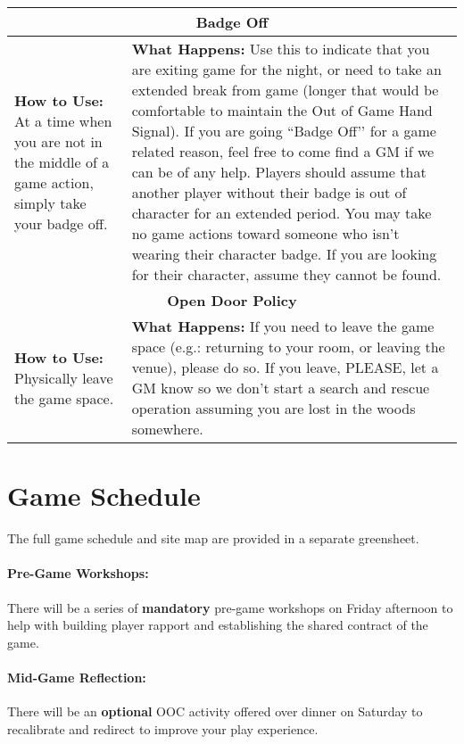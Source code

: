 \documentclass[sheet]{GL2020}
\begin{document}
\begin{tabularx}{\textwidth}{| m{4cm} | X |}
\hline
\hline
	\multicolumn{2}{|c|}{\textbf{Badge Off}}\\
\hline
	\textbf{How to Use:} At a time when you are not in the middle of a game action, simply take your badge off. & \textbf{\newline What Happens:} Use this to indicate that you are exiting game for the night, or need to take an extended break from game (longer that would be comfortable to maintain the Out of Game Hand Signal). If you are going ``Badge Off'’ for a game related reason, feel free to come find a GM if we can be of any help. Players should assume that another player without their badge is out of character for an extended period. You may take no game actions toward someone who isn't wearing their character badge. If you are looking for their character, assume they cannot be found. \newline \\
\hline
\hline
	\multicolumn{2}{|c|}{\textbf{Open Door Policy}}\\
\hline
	\textbf{How to Use:} Physically leave the game space. & \textbf{\newline What Happens:} If you need to leave the game space (e.g.: returning to your room, or leaving the venue), please do so. If you leave, PLEASE, let a GM know so we don't start a search and rescue operation assuming you are lost in the woods somewhere. \newline \\
\hline
\end{tabularx}

\section{Game Schedule}
The full game schedule and site map are provided in a separate greensheet. 

\paragraph{Pre-Game Workshops:} There will be a series of \textbf{mandatory} pre-game workshops on Friday afternoon to help with building player rapport and establishing the shared contract of the game.

\paragraph{Mid-Game Reflection:} There will be an \textbf{optional} OOC activity offered over dinner on Saturday to recalibrate and redirect to improve your play experience.
\end{document}
